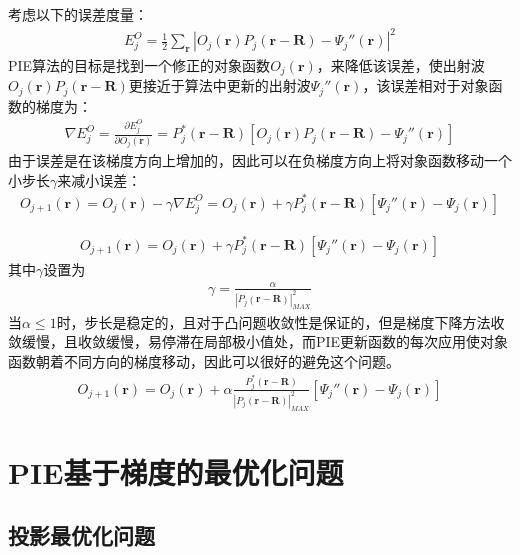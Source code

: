 \documentclass[10pt,aspectratio=169]{beamer} %
\renewcommand{\vec}[1]{\boldsymbol{#1}} %
\begin{document}
\begin{frame}
    考虑以下的误差度量：
    \begin{align*}
        E_j^O = \frac{1}{2} \sum _{\vec{r}} |O_j(\vec{r})P_j(\vec{r}-\vec{R})-\Psi _j''(\vec{r})|^2
    \end{align*}
    PIE算法的目标是找到一个修正的对象函数$O_j(\vec{r})$，来降低该误差，使出射波$O_j(\vec{r})P_j(\vec{r}-\vec{R})$更接近于算法中更新的出射波$\Psi _j''(\vec{r})$，该误差相对于对象函数的梯度为：
    \begin{align*}
        \nabla E_j^O = \frac{\partial E_j^O}{\partial O_j(\vec{r})} = P_j^*(\vec{r}-\vec{R}) [O_j(\vec{r})P_j(\vec{r}-\vec{R})-\Psi _j''(\vec{r})]
    \end{align*}
    由于误差是在该梯度方向上增加的，因此可以在负梯度方向上将对象函数移动一个小步长$\gamma$来减小误差：
    \begin{align*}
        O_{j+1}(\vec{r}) = O_{j}(\vec{r}) - \gamma \nabla E_j^O = O_{j}(\vec{r}) + \gamma P_j^*(\vec{r}-\vec{R}) [\Psi _j''(\vec{r}) - \Psi _j(\vec{r})]
    \end{align*}
\end{frame}

\begin{frame}
    \begin{align*}
        O_{j+1}(\vec{r}) = O_{j}(\vec{r}) + \gamma P_j^*(\vec{r}-\vec{R}) [\Psi _j''(\vec{r}) - \Psi _j(\vec{r})]
    \end{align*}
    其中$\gamma$设置为
    \begin{align*}
        \gamma=\frac{\alpha}{|P_j(\vec{r}-\vec{R})|_{MAX}^2}
    \end{align*}
    当$\alpha \leq 1$时，步长是稳定的，且对于凸问题收敛性是保证的，但是梯度下降方法收敛缓慢，且收敛缓慢，易停滞在局部极小值处，而PIE更新函数的每次应用使对象函数朝着不同方向的梯度移动，因此可以很好的避免这个问题。
    \begin{align*}
        O_{j+1}(\vec{r}) =O_{j}(\vec{r})+\alpha \frac{P_j^*(\vec{r}-\vec{R})}{|P_j(\vec{r}-\vec{R})|_{MAX}^2}[\Psi _{j}''(\vec{r})-\Psi _{j}(\vec{r})]
    \end{align*}
    
    
\end{frame}

\section{PIE基于梯度的最优化问题}

\subsection{投影最优化问题}
\end{document}
